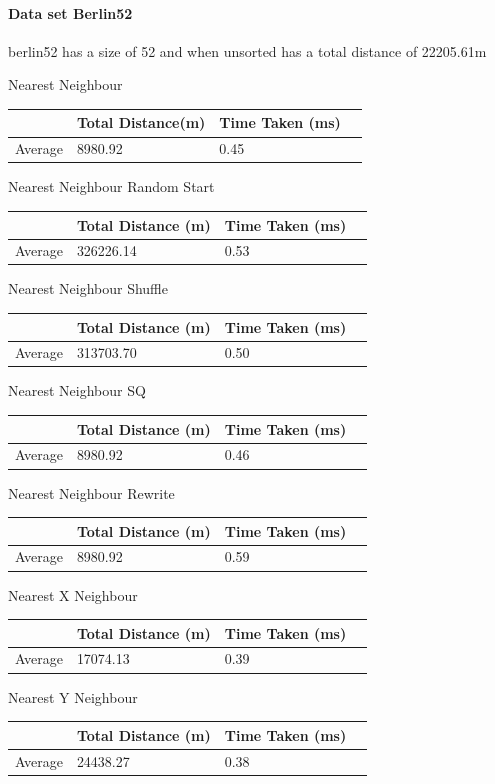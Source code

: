 \documentclass[conference,backref=page]{acmsiggraph}
\begin{document}
\paragraph{Data set Berlin52} \hfill

berlin52 has a size of 52 and when unsorted has a total distance of 22205.61m

\begin{center}	
	
	Nearest Neighbour
	\begin{tabular}{| l | l | l | l |}
		\hline
		& Total Distance(m)& Time Taken (ms)\\ \hline
		Average & 8980.92 & 0.45 \\ \hline
	\end{tabular}
	
	Nearest Neighbour Random Start
	\begin{tabular}{| l | l | l | l |}
		\hline
		& Total Distance (m) & Time Taken (ms)\\ \hline
		Average & 326226.14 & 0.53 \\ \hline
	\end{tabular}
	
	Nearest Neighbour Shuffle
	\begin{tabular}{| l | l | l | l |}
		\hline
		& Total Distance (m) & Time Taken (ms)\\ \hline
		Average & 313703.70 & 0.50 \\ \hline
	\end{tabular}
	
	Nearest Neighbour SQ
	\begin{tabular}{| l | l | l | l |}
		\hline
		& Total Distance (m) & Time Taken (ms)\\ \hline
		Average & 8980.92 & 0.46 \\ \hline
	\end{tabular}
	
	Nearest Neighbour Rewrite
	\begin{tabular}{| l | l | l | l |}
		\hline
		& Total Distance (m) & Time Taken (ms)\\ \hline
		Average & 8980.92 & 0.59 \\ \hline
	\end{tabular}
	
	
	Nearest X Neighbour	
	\begin{tabular}{| l | l | l | l |}
		\hline
		& Total Distance (m) & Time Taken (ms)\\ \hline
		Average & 17074.13 & 0.39 \\ \hline	
	\end{tabular}
	
	Nearest Y Neighbour	
	\begin{tabular}{| l | l | l | l |}
		\hline
		& Total Distance (m) & Time Taken (ms)\\ \hline
		Average & 24438.27 & 0.38 \\ \hline
	\end{tabular}
\end{center}
\end{document}
